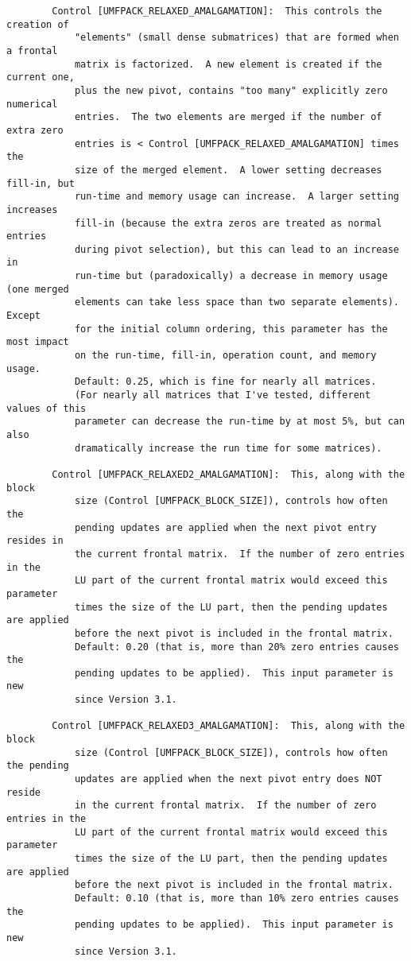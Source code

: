 {\begin{verbatim}
        Control [UMFPACK_RELAXED_AMALGAMATION]:  This controls the creation of
            "elements" (small dense submatrices) that are formed when a frontal
            matrix is factorized.  A new element is created if the current one,
            plus the new pivot, contains "too many" explicitly zero numerical
            entries.  The two elements are merged if the number of extra zero
            entries is < Control [UMFPACK_RELAXED_AMALGAMATION] times the
            size of the merged element.  A lower setting decreases fill-in, but
            run-time and memory usage can increase.  A larger setting increases
            fill-in (because the extra zeros are treated as normal entries
            during pivot selection), but this can lead to an increase in
            run-time but (paradoxically) a decrease in memory usage (one merged
            elements can take less space than two separate elements).  Except
            for the initial column ordering, this parameter has the most impact
            on the run-time, fill-in, operation count, and memory usage.
            Default: 0.25, which is fine for nearly all matrices.
            (For nearly all matrices that I've tested, different values of this
            parameter can decrease the run-time by at most 5%, but can also
            dramatically increase the run time for some matrices).

        Control [UMFPACK_RELAXED2_AMALGAMATION]:  This, along with the block
            size (Control [UMFPACK_BLOCK_SIZE]), controls how often the
            pending updates are applied when the next pivot entry resides in
            the current frontal matrix.  If the number of zero entries in the
            LU part of the current frontal matrix would exceed this parameter
            times the size of the LU part, then the pending updates are applied
            before the next pivot is included in the frontal matrix.
            Default: 0.20 (that is, more than 20% zero entries causes the
            pending updates to be applied).  This input parameter is new
            since Version 3.1.

        Control [UMFPACK_RELAXED3_AMALGAMATION]:  This, along with the block
            size (Control [UMFPACK_BLOCK_SIZE]), controls how often the pending
            updates are applied when the next pivot entry does NOT reside
            in the current frontal matrix.  If the number of zero entries in the
            LU part of the current frontal matrix would exceed this parameter
            times the size of the LU part, then the pending updates are applied
            before the next pivot is included in the frontal matrix.
            Default: 0.10 (that is, more than 10% zero entries causes the
            pending updates to be applied).  This input parameter is new
            since Version 3.1.


\end{verbatim}}
